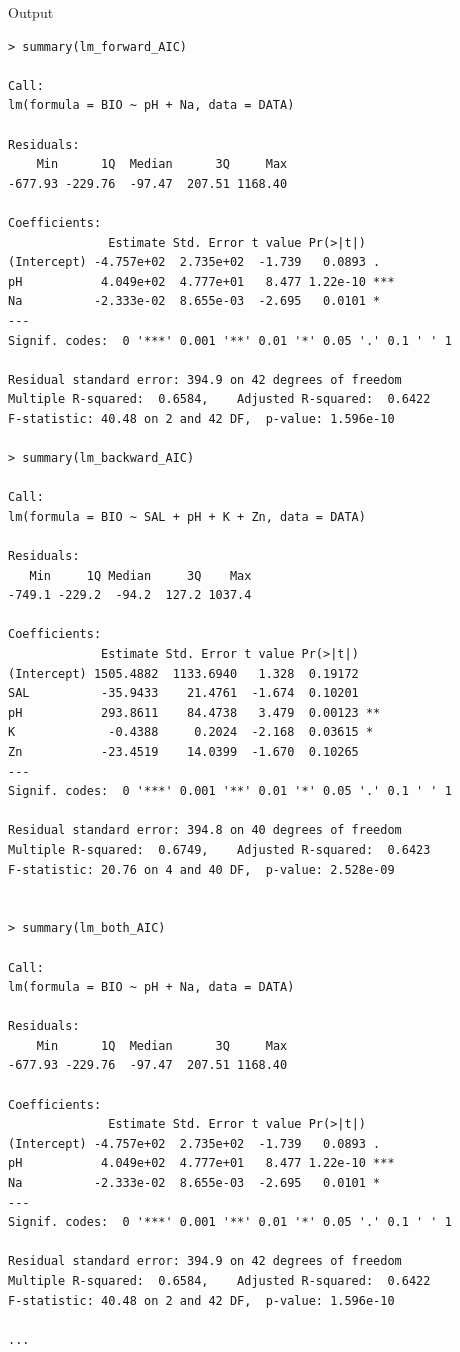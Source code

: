 \newpage
Output
\begin{lstlisting}[style=output,basicstyle=\tiny]
> summary(lm_forward_AIC)

Call:
lm(formula = BIO ~ pH + Na, data = DATA)

Residuals:
    Min      1Q  Median      3Q     Max 
-677.93 -229.76  -97.47  207.51 1168.40 

Coefficients:
              Estimate Std. Error t value Pr(>|t|)    
(Intercept) -4.757e+02  2.735e+02  -1.739   0.0893 .  
pH           4.049e+02  4.777e+01   8.477 1.22e-10 ***
Na          -2.333e-02  8.655e-03  -2.695   0.0101 *  
---
Signif. codes:  0 '***' 0.001 '**' 0.01 '*' 0.05 '.' 0.1 ' ' 1

Residual standard error: 394.9 on 42 degrees of freedom
Multiple R-squared:  0.6584,	Adjusted R-squared:  0.6422 
F-statistic: 40.48 on 2 and 42 DF,  p-value: 1.596e-10

> summary(lm_backward_AIC)

Call:
lm(formula = BIO ~ SAL + pH + K + Zn, data = DATA)

Residuals:
   Min     1Q Median     3Q    Max 
-749.1 -229.2  -94.2  127.2 1037.4 

Coefficients:
             Estimate Std. Error t value Pr(>|t|)   
(Intercept) 1505.4882  1133.6940   1.328  0.19172   
SAL          -35.9433    21.4761  -1.674  0.10201   
pH           293.8611    84.4738   3.479  0.00123 **
K             -0.4388     0.2024  -2.168  0.03615 * 
Zn           -23.4519    14.0399  -1.670  0.10265   
---
Signif. codes:  0 '***' 0.001 '**' 0.01 '*' 0.05 '.' 0.1 ' ' 1

Residual standard error: 394.8 on 40 degrees of freedom
Multiple R-squared:  0.6749,	Adjusted R-squared:  0.6423 
F-statistic: 20.76 on 4 and 40 DF,  p-value: 2.528e-09


> summary(lm_both_AIC)

Call:
lm(formula = BIO ~ pH + Na, data = DATA)

Residuals:
    Min      1Q  Median      3Q     Max 
-677.93 -229.76  -97.47  207.51 1168.40 

Coefficients:
              Estimate Std. Error t value Pr(>|t|)    
(Intercept) -4.757e+02  2.735e+02  -1.739   0.0893 .  
pH           4.049e+02  4.777e+01   8.477 1.22e-10 ***
Na          -2.333e-02  8.655e-03  -2.695   0.0101 *  
---
Signif. codes:  0 '***' 0.001 '**' 0.01 '*' 0.05 '.' 0.1 ' ' 1

Residual standard error: 394.9 on 42 degrees of freedom
Multiple R-squared:  0.6584,	Adjusted R-squared:  0.6422 
F-statistic: 40.48 on 2 and 42 DF,  p-value: 1.596e-10

...
\end{lstlisting}

